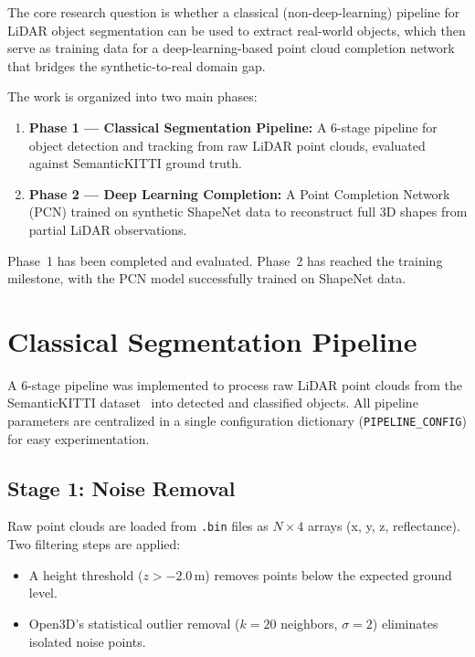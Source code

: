 \documentclass[a4paper, 12pt]{article}
\begin{document}
The core research question is whether a classical (non-deep-learning) pipeline for LiDAR object segmentation can be used to extract real-world objects, which then serve as training data for a deep-learning-based point cloud completion network that bridges the synthetic-to-real domain gap.

The work is organized into two main phases:
\begin{enumerate}[nosep]
    \item \textbf{Phase 1 --- Classical Segmentation Pipeline:} A 6-stage pipeline for object detection and tracking from raw LiDAR point clouds, evaluated against SemanticKITTI ground truth.
    \item \textbf{Phase 2 --- Deep Learning Completion:} A Point Completion Network (PCN) trained on synthetic ShapeNet data to reconstruct full 3D shapes from partial LiDAR observations.
\end{enumerate}

Phase~1 has been completed and evaluated. Phase~2 has reached the training milestone, with the PCN model successfully trained on ShapeNet data.

\section{Classical Segmentation Pipeline}

A 6-stage pipeline was implemented to process raw LiDAR point clouds from the SemanticKITTI dataset~\cite{behley2019iccv} into detected and classified objects. All pipeline parameters are centralized in a single configuration dictionary (\texttt{PIPELINE\_CONFIG}) for easy experimentation.

\subsection{Stage 1: Noise Removal}

Raw point clouds are loaded from \texttt{.bin} files as $N \times 4$ arrays (x, y, z, reflectance). Two filtering steps are applied:
\begin{itemize}[nosep]
    \item A height threshold ($z > -2.0$\,m) removes points below the expected ground level.
    \item Open3D's statistical outlier removal ($k=20$ neighbors, $\sigma=2$) eliminates isolated noise points.
\end{itemize}
\end{document}
